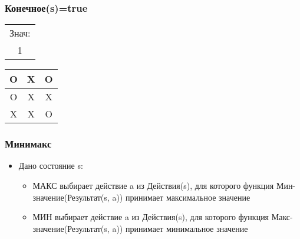 \documentclass[professionalfonts]{beamer}
\begin{document}
\begin{frame}
	\frametitle{Конечное(s)=true}
	\centering
	\begin{tabular}{c}
	Знач:\\
		1
	\end{tabular} 
	\begin{tabular}{c|c|c}
	 O& X & O \\ \hline
	O& X & X \\ \hline
		X& X & O
\end{tabular}  
\end{frame}
\begin{frame}[fragile]\fontsize{6}{12}\selectfont

\end{frame}
{

}
{

}
{

}
{

}

\begin{frame}
	\frametitle{Минимакс}
		\begin{itemize}
				\item Дано состояние s:
			\begin{itemize}
				\item МАКС выбирает действие a из Действия(s), для которого  функция Мин-значение(Результат(s, a)) принимает максимальное значение 
				\item МИН выбирает действие a из Действия(s), для которого функция Макс-значение(Результат(s, a)) принимает минимальное значение
		\end{itemize}
		\end{itemize}
\end{frame}
\end{document}
